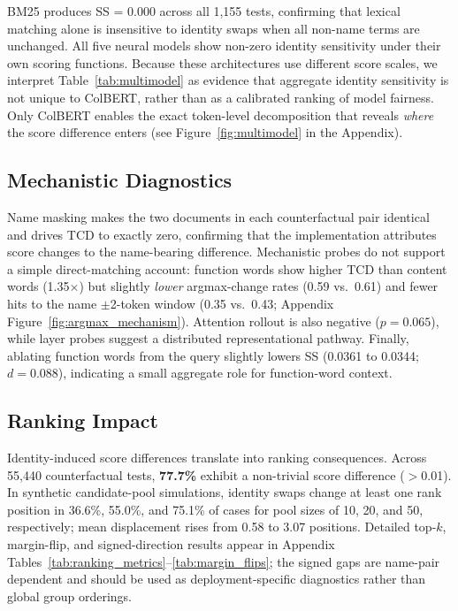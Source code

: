 \documentclass[11pt]{article}
\begin{document}
BM25 produces SS = 0.000 across all 1{,}155 tests, confirming that lexical matching alone is insensitive to identity swaps when all non-name terms are unchanged. All five neural models show non-zero identity sensitivity under their own scoring functions. Because these architectures use different score scales, we interpret Table~\ref{tab:multimodel} as evidence that aggregate identity sensitivity is not unique to ColBERT, rather than as a calibrated ranking of model fairness. Only ColBERT enables the exact token-level decomposition that reveals \emph{where} the score difference enters (see Figure~\ref{fig:multimodel} in the Appendix).

\subsection{Mechanistic Diagnostics}
\label{sec:results:mechanism}

Name masking makes the two documents in each counterfactual pair identical and drives TCD to exactly zero, confirming that the implementation attributes score changes to the name-bearing difference. Mechanistic probes do not support a simple direct-matching account: function words show higher TCD than content words (1.35$\times$) but slightly \emph{lower} argmax-change rates (0.59 vs.\ 0.61) and fewer hits to the name $\pm$2-token window (0.35 vs.\ 0.43; Appendix Figure~\ref{fig:argmax_mechanism}). Attention rollout is also negative ($p=0.065$), while layer probes suggest a distributed representational pathway. Finally, ablating function words from the query slightly lowers SS (0.0361 to 0.0344; $d=0.088$), indicating a small aggregate role for function-word context.

\subsection{Ranking Impact}
\label{sec:results:ranking}
Identity-induced score differences translate into ranking consequences. Across 55{,}440 counterfactual tests, \textbf{77.7\%} exhibit a non-trivial score difference ($>$0.01). In synthetic candidate-pool simulations, identity swaps change at least one rank position in 36.6\%, 55.0\%, and 75.1\% of cases for pool sizes of 10, 20, and 50, respectively; mean displacement rises from 0.58 to 3.07 positions. Detailed top-$k$, margin-flip, and signed-direction results appear in Appendix Tables~\ref{tab:ranking_metrics}--\ref{tab:margin_flips}; the signed gaps are name-pair dependent and should be used as deployment-specific diagnostics rather than global group orderings.
\end{document}
